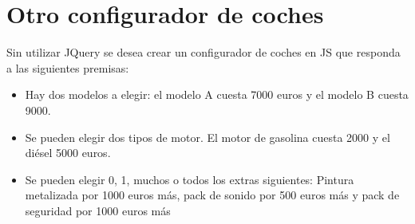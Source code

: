 \documentclass[letterpaper,10pt,spanish]{sphinxmanual}
\begin{document}
\section{Otro configurador de coches}
\label{\detokenize{tema4:otro-configurador-de-coches}}
Sin utilizar JQuery se desea crear un configurador de coches en JS que responda a las siguientes premisas:
\begin{itemize}
\item {} 
Hay dos modelos a elegir: el modelo A cuesta 7000 euros y el modelo B cuesta 9000.

\item {} 
Se pueden elegir dos tipos de motor. El motor de gasolina cuesta 2000 y el diésel 5000 euros.

\item {} 
Se pueden elegir 0, 1, muchos o todos los extras siguientes: Pintura metalizada por 1000 euros más, pack de sonido por 500 euros más y pack de seguridad por 1000 euros más

\end{itemize}
\end{document}
